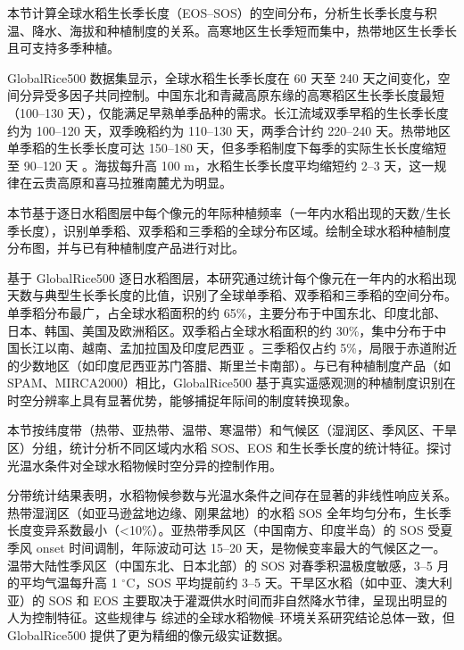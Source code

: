 
本节计算全球水稻生长季长度（EOS--SOS）的空间分布，分析生长季长度与积温、降水、海拔和种植制度的关系。高寒地区生长季短而集中，热带地区生长季长且可支持多季种植。

GlobalRice500 数据集显示，全球水稻生长季长度在 60 天至 240 天之间变化，空间分异受多因子共同控制。中国东北和青藏高原东缘的高寒稻区生长季长度最短（100--130 天），仅能满足早熟单季品种的需求。长江流域双季早稻的生长季长度约为 100--120 天，双季晚稻约为 110--130 天，两季合计约 220--240 天。热带地区单季稻的生长季长度可达 150--180 天，但多季稻制度下每季的实际生长长度缩短至 90--120 天 \cite{Gumma2014}。海拔每升高 100 m，水稻生长季长度平均缩短约 2--3 天，这一规律在云贵高原和喜马拉雅南麓尤为明显。


本节基于逐日水稻图层中每个像元的年际种植频率（一年内水稻出现的天数/生长季长度），识别单季稻、双季稻和三季稻的全球分布区域。绘制全球水稻种植制度分布图，并与已有种植制度产品进行对比。

基于 GlobalRice500 逐日水稻图层，本研究通过统计每个像元在一年内的水稻出现天数与典型生长季长度的比值，识别了全球单季稻、双季稻和三季稻的空间分布。单季稻分布最广，占全球水稻面积的约 65\%，主要分布于中国东北、印度北部、日本、韩国、美国及欧洲稻区。双季稻占全球水稻面积的约 30\%，集中分布于中国长江以南、越南、孟加拉国及印度尼西亚 \cite{Han2021}。三季稻仅占约 5\%，局限于赤道附近的少数地区（如印度尼西亚苏门答腊、斯里兰卡南部）。与已有种植制度产品（如 SPAM、MIRCA2000）相比，GlobalRice500 基于真实遥感观测的种植制度识别在时空分辨率上具有显著优势，能够捕捉年际间的制度转换现象。

本节按纬度带（热带、亚热带、温带、寒温带）和气候区（湿润区、季风区、干旱区）分组，统计分析不同区域内水稻 SOS、EOS 和生长季长度的统计特征。探讨光温水条件对全球水稻物候时空分异的控制作用。

分带统计结果表明，水稻物候参数与光温水条件之间存在显著的非线性响应关系。热带湿润区（如亚马逊盆地边缘、刚果盆地）的水稻 SOS 全年均匀分布，生长季长度变异系数最小（<10\%）。亚热带季风区（中国南方、印度半岛）的 SOS 受夏季风 onset 时间调制，年际波动可达 15--20 天，是物候变率最大的气候区之一。温带大陆性季风区（中国东北、日本北部）的 SOS 对春季积温极度敏感，3--5 月的平均气温每升高 1 $^{\circ}\mathrm{C}$，SOS 平均提前约 3--5 天。干旱区水稻（如中亚、澳大利亚）的 SOS 和 EOS 主要取决于灌溉供水时间而非自然降水节律，呈现出明显的人为控制特征。这些规律与 \cite{Dong2016} 综述的全球水稻物候--环境关系研究结论总体一致，但 GlobalRice500 提供了更为精细的像元级实证数据。

